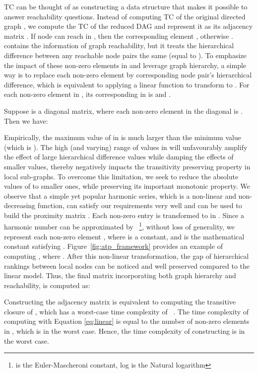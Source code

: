 \documentclass[letterpaper]{article} \usepackage{aaai19}  \usepackage{times}  \usepackage{helvet}  \usepackage{courier}  \usepackage{url}  \usepackage{graphicx}  \usepackage{booktabs} \usepackage{xcolor}
\begin{document}
TC can be thought of as constructing a data structure that makes it possible to answer reachability questions. Instead of computing TC of the original directed graph , we compute the TC of the reduced DAG  and represent it as its adjacency matrix . If node  can reach  in , then the corresponding element , otherwise .
 contains the information of graph reachability, but it treats the hierarchical difference between any reachable node pairs the same (equal to ). To emphasize the impact of these non-zero elements in  and leverage graph hierarchy, a simple way is to replace each non-zero element by corresponding node pair's hierarchical difference, which is equivalent to applying a linear function to transform  to . For each non-zero element  in , its corresponding  in  is  and .   


Suppose  is a diagonal matrix, where each non-zero element in the diagonal is . Then we have:




Empirically, the maximum value of  in  is much larger than the minimum value (which is ). The high (and varying) range of values in  will unfavourably amplify the effect of large hierarchical difference values while damping the effects of smaller values, thereby negatively impacts the transitivity preserving property in local sub-graphs.
To overcome this limitation, we seek to reduce the absolute values of  to smaller ones, while preserving its important monotonic property.
We observe that a simple yet popular harmonic series, which is a non-linear and non-decreasing function, can satisfy our requirements very well and can be used to build the proximity matrix .
Each non-zero entry  is transformed to  in . Since a harmonic number  can be approximated by ~\footnote{ is the Euler-Mascheroni constant, log is the Natural logarithm}, without loss of generality, we represent each non-zero element , where  is a constant, and  is the  mathematical constant satisfying .
Figure~\ref{fig:atp_framework} provides an example of computing , where .
After this non-linear transformation, the gap of hierarchical rankings between local nodes can be noticed and well preserved compared to the linear model. Thus, the final matrix  incorporating both graph hierarchy and reachability, 
is computed as:


Constructing the adjacency matrix  is equivalent to computing the transitive closure of , which has a worst-case time complexity of ~\cite{SIMON1988325}.
The time complexity of computing   with Equation \ref{eq:linear} is equal to the number of non-zero elements in , which is  in the worst case. Hence, the time complexity of constructing  is  in the worst case. 
\end{document}
